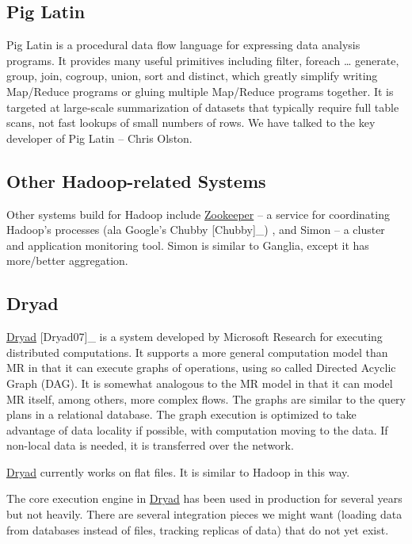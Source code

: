 \documentclass[DM,lsstdraft,toc]{lsstdoc}
\begin{document}
\subsection{Pig Latin}\label{pig-latin}

Pig Latin is a procedural data flow language for expressing data
analysis programs. It provides many useful primitives including filter,
foreach \ldots{} generate, group, join, cogroup, union, sort and
distinct, which greatly simplify writing Map/Reduce programs or gluing
multiple Map/Reduce programs together. It is targeted at large-scale
summarization of datasets that typically require full table scans, not
fast lookups of small numbers of rows. We have talked to the key
developer of Pig Latin -- Chris Olston.

\subsection{Other Hadoop-related
Systems}\label{other-hadoop-related-systems}

Other systems build for Hadoop include
\href{website:\%20http://zookeeper.sourceforge.net/}{Zookeeper} -- a
service for coordinating Hadoop's processes (ala Google's Chubby
{[}Chubby{]}\_) , and Simon -- a cluster and application monitoring
tool. Simon is similar to Ganglia, except it has more/better
aggregation.

\subsection{Dryad}\label{dryad}

\href{http://research.microsoft.com/en-us/projects/dryad/}{Dryad}
{[}Dryad07{]}\_ is a system developed by Microsoft Research for
executing distributed computations. It supports a more general
computation model than MR in that it can execute graphs of operations,
using so called Directed Acyclic Graph (DAG). It is somewhat analogous
to the MR model in that it can model MR itself, among others, more
complex flows. The graphs are similar to the query plans in a relational
database. The graph execution is optimized to take advantage of data
locality if possible, with computation moving to the data. If non-local
data is needed, it is transferred over the network.

\href{http://research.microsoft.com/en-us/projects/dryad/}{Dryad}
currently works on flat files. It is similar to Hadoop in this way.

The core execution engine in
\href{http://research.microsoft.com/en-us/projects/dryad/}{Dryad} has
been used in production for several years but not heavily. There are
several integration pieces we might want (loading data from databases
instead of files, tracking replicas of data) that do not yet exist.
\end{document}
